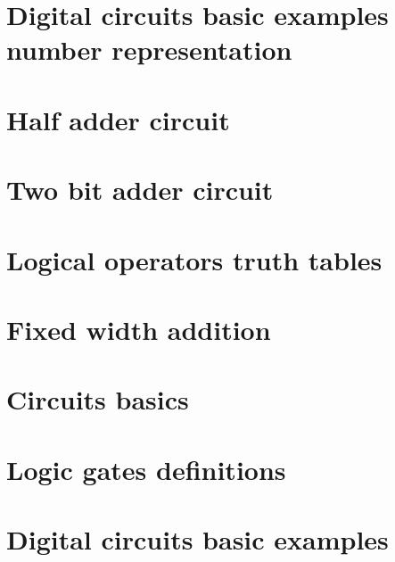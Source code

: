 
\section*{Digital circuits basic examples number representation}

\vfill
\section*{Half adder circuit}

\vfill
\section*{Two bit adder circuit}

\vfill
\section*{Logical operators truth tables}

\vfill
\section*{Fixed width addition}

\vfill
\section*{Circuits basics}

\vfill
\section*{Logic gates definitions}

\vfill
\section*{Digital circuits basic examples}

\vfill
